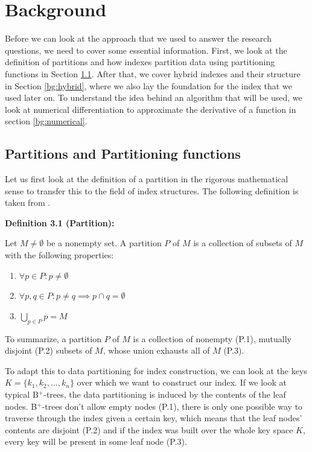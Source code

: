 \thispagestyle{plain}
\chapter{Background}

Before we can look at the approach that we used to answer the research questions, we need to cover some essential information. First, we look at the definition of partitions and how indexes partition data using partitioning functions in Section \ref{bg:partitions}. After that, we cover hybrid indexes and their structure in Section \ref{bg:hybrid}, where we also lay the foundation for the index that we used later on. To understand the idea behind an algorithm that will be used, we look at numerical differentiation to approximate the derivative of a function in section \ref{bg:numerical}.

\section{Partitions and Partitioning functions}\label{bg:partitions}
Let us first look at the definition of a partition in the rigorous mathematical sense to transfer this to the field of index structures. The following definition is taken from \citeauthor{Lucas1990} \cite{Lucas1990}.

\vspace{0.5cm}
\noindent \textbf{Definition 3.1 (Partition):}

\noindent Let $M \neq \emptyset$ be a nonempty set. A partition $P$ of $M$ is a collection of subsets of $M$ with the following properties:

\begin{enumerate}
    \item[P.1] $\forall p \in P: p \neq \emptyset$
    \item[P.2] $\forall p,q \in P: p \neq q \implies p \cap q = \emptyset$
    \item[P.3] $\bigcup_{p \in P} p = M$
\end{enumerate}

\noindent To summarize, a partition $P$ of $M$ is a collection of nonempty (P.1), mutually disjoint (P.2) subsets of $M$, whose union exhausts all of $M$ (P.3).

\vspace{0.5cm}
To adapt this to data partitioning for index construction, we can look at the keys $K = \{k_1, k_2, ..., k_n\}$ over which we want to construct our index. If we look at typical B$^+$-trees, the data partitioning is induced by the contents of the leaf nodes. B$^+$-trees don't allow empty nodes (P.1), there is only one possible way to traverse through the index given a certain key, which means that the leaf nodes' contents are disjoint (P.2) and if the index was built over the whole key space $K$, every key will be present in some leaf node (P.3). 

